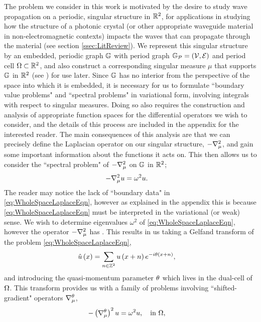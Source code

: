 The problem we consider in this work is motivated by the desire to study wave propagation on a periodic, singular structure in $\mathbb{R}^2$, for applications in studying how the structure of a photonic crystal (or other appropriate waveguide material in non-electromagnetic contexts) impacts the waves that can propagate through the material (see section \ref{ssec:LitReview}).
We represent this singular structure by an embedded, periodic graph $\mathbb{G}$ with period graph $\mathbb{G}_{\mathcal{P}}=\left( \mathcal{V}, \mathcal{E} \right)$ and period cell $\Omega\subset\mathbb{R}^2$, and also construct a corresponding singular measure $\mu$ that supports $\mathbb{G}$ in $\mathbb{R}^2$ (see ) for use later.
Since $\mathbb{G}$ has no interior from the perspective of the space into which it is embedded, it is necessary for us to formulate ``boundary value problems" and ``spectral problems" in variational form, involving integrals with respect to singular measures.
Doing so also requires the construction and analysis of appropriate function spaces for the differential operators we wish to consider, and the details of this process are included in the appendix  for the interested reader.
The main consequences of this analysis are that we can precisely define the Laplacian operator on our singular structure, $-\nabla^2_{\mu}$, and gain some important information about the functions it acts on.
This then allows us to consider the ``spectral problem" of $-\nabla^2_{\mu}$ on $\mathbb{G}$ in $\mathbb{R}^2$;
\begin{align} \label{eq:WholeSpaceLaplaceEqn}
	-\nabla^2_{\mu} u &= \omega^2 u.
\end{align}
The reader may notice the lack of ``boundary data" in \eqref{eq:WholeSpaceLaplaceEqn}, however as explained in the appendix  this is because \eqref{eq:WholeSpaceLaplaceEqn} must be interpreted in the variational (or weak) sense.
We wish to determine eigenvalues $\omega^2$ of \eqref{eq:WholeSpaceLaplaceEqn}, however the operator $-\nabla^2_{\mu}$ has .
This results in us taking a Gelfand transform of the problem \eqref{eq:WholeSpaceLaplaceEqn}, 
\begin{align*}
	\hat{u}\left( x \right) &= \sum_{n\in\mathbb{Z}^2}u\left( x+n \right)e^{-i\theta\left( x+n \right)},
\end{align*}
and introducing the quasi-momentum parameter $\theta$ which lives in the dual-cell of $\Omega$.
This transform provides us with a family of problems involving ``shifted-gradient" operators $\nabla^{\theta}_{\mu}$,
\begin{align} \label{eq:PeriodCellLaplaceStrongForm}
	-\left( \nabla^{\theta}_{\mu} \right)^2 u &= \omega^2 u, \quad\text{in } \Omega,
\end{align}
